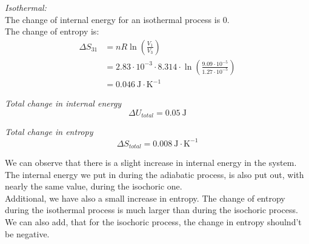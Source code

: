 \documentclass{scrartcl}
\begin{document}
\textit{Isothermal:}\\
The change of internal energy for an isothermal process is 0.\\
The change of entropy is:
    \begin{align*}
        \Delta S_{31} &= nR\ln\left(\frac{V_1}{V_3}\right)\\
        &= 2.83 \cdot 10^{-3} \cdot 8.314\cdot \ln\left(\frac{9.09 \cdot 10^{-5}}{1.27 \cdot 10^{-5}}\right)\\
        &= \boxed{0.046 \ \text{J} \cdot \text{K}^{-1}}
    \end{align*}
\vspace{0.3cm}

\textit{Total change in internal energy}
\[ \Delta U_{total} = 0.05 \ \text{J} \]

\textit{Total change in entropy}
\[ \Delta S_{total} = 0.008  \ \text{J} \cdot \text{K}^{-1} \]

We can observe that there is a slight increase in internal energy in the system. The internal energy we put  in during the adiabatic process, is also put out, with nearly the same value, during the isochoric one.\\
Additional, we have also a small increase in entropy. The change of entropy during the isothermal process is much larger than during the isochoric process. We can also add, that for the isochoric process, the change in entropy shoulnd't be negative.
\end{document}
